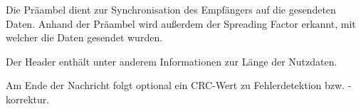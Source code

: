 Die Präambel dient zur Synchronisation des Empfängers auf die gesendeten Daten.
Anhand der Präambel wird außerdem der Spreading Factor erkannt, mit welcher die Daten gesendet wurden.

Der Header enthält unter anderem Informationen zur Länge der Nutzdaten.

Am Ende der Nachricht folgt optional ein CRC-Wert zu Fehlerdetektion bzw. -korrektur.